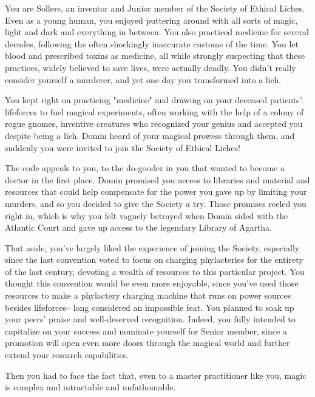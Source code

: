 \documentclass[char]{Sel}
\begin{document}
\name{\cSollers{}}
You are Sollers, an inventor and Junior member of the Society of Ethical Liches. Even as a young human, you enjoyed puttering around with all sorts of magic, light and dark and everything in between. You also practiced medicine for several decades, following the often shockingly inaccurate customs of the time. You let blood and prescribed toxins as medicine, all while strongly suspecting that these practices, widely believed to save lives, were actually deadly. You didn't really consider yourself a murderer, and yet one day you transformed into a lich.

You kept right on practicing "medicine" and drawing on your deceased patients' lifeforces to fuel magical experiments, often working with the help of a colony of rogue gnomes, inventive creatures who recognized your genius and accepted you despite being a lich. Domin heard of your magical prowess through them, and suddenly you were invited to join the Society of Ethical Liches!

The code appeals to you, to the do-gooder in you that wanted to become a doctor in the first place. Domin promised you access to libraries and material and resources that could help compensate for the power you gave up by limiting your murders, and so you decided to give the Society a try. Those promises reeled you right in, which is why you felt vaguely betrayed when Domin sided with the Atlantic Court and gave up access to the legendary Library of Agartha.

That aside, you've largely liked the experience of joining the Society, especially since the last convention voted to focus on charging phylacteries for the entirety of the last century, devoting a wealth of resources to this particular project. You thought this convention would be even more enjoyable, since you've used those resources to make a phylactery charging machine that runs on power sources besides lifeforces-- long considered an impossible feat. You planned to soak up your peers' praise and well-deserved recognition. Indeed, you fully intended to capitalize on your success and nominate yourself for Senior member, since a promotion will open even more doors through the magical world and further extend your research capabilities.

Then you had to face the fact that, even to a master practitioner like you, magic is complex and intractable and unfathomable.
\end{document}
